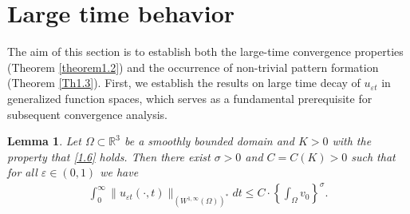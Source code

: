 \documentclass[12pt]{article}
\theoremstyle{plain}
\newtheorem{lemma}{Lemma}[section]
\theoremstyle{definition}
\numberwithin{equation}{section}
\begin{document}
\section{Large time behavior }
The aim of this section is to establish both the large-time convergence properties (Theorem \ref{theorem1.2}) and the occurrence of non-trivial pattern formation (Theorem \ref{Th1.3}). First, we establish the results on  large time decay of
 $u_{\varepsilon t}$ in generalized function spaces, which serves as a fundamental prerequisite for subsequent convergence analysis.
\begin{lemma}\label{lemma4.1}
Let $\Omega \subset \mathbb R^3$  be a smoothly bounded domain and $K>0$ with the property that \eqref{1.6} holds. Then there exist  $\sigma>0$ and $C=C(K)>0$ such that for all $\varepsilon\in(0,1)$ we have
\begin{align}\label{4.1}
   \int_0^{\infty}\|u_{\varepsilon t}(\cdot,t)\|_{(W^{1,\infty}(\Omega))^*}dt\leq C\cdot \left\{\int_\Omega v_{0}\right\}^{\sigma}.
\end{align}
\end{lemma}
\end{document}
